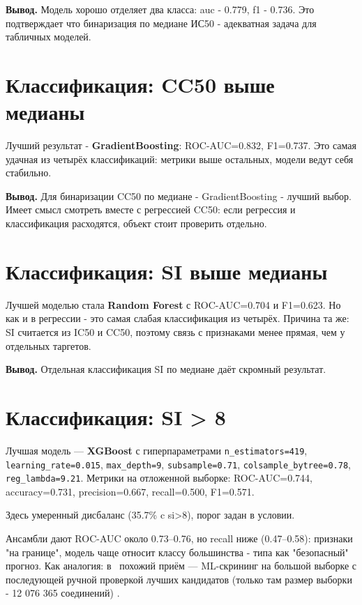 \documentclass[12pt,a4paper]{report}
\begin{document}
\textbf{Вывод.} Модель хорошо отделяет два класса: auc - 0.779, f1 - 0.736. Это подтверждает что бинаризация по медиане ИС50 - адекватная задача для табличных моделей.

\section{Классификация: CC50 выше медианы}

Лучший результат - \textbf{GradientBoosting}: ROC-AUC=0.832, F1=0.737. Это самая удачная из четырёх классификаций: метрики выше остальных, модели ведут себя стабильно.

\textbf{Вывод.} Для бинаризации CC50 по медиане - GradientBoosting - лучший выбор. Имеет смысл смотреть вместе с регрессией CC50: если регрессия и классификация расходятся, объект стоит проверить отдельно.

\section{Классификация: SI выше медианы}

Лучшей моделью стала \textbf{Random Forest} с ROC-AUC=0.704 и F1=0.623. Но как и в регрессии - это самая слабая классификация из четырёх. Причина та же: SI считается из IC50 и CC50, поэтому связь с признаками менее прямая, чем у отдельных таргетов.

\textbf{Вывод.} Отдельная классификация SI по медиане даёт скромный результат. 

\section{Классификация: SI > 8}

Лучшая модель --- \textbf{XGBoost} с гиперпараметрами \texttt{n\_estimators=419}, \texttt{learning\_rate=0.015}, \texttt{max\_depth=9}, \texttt{subsample=0.71}, \texttt{colsample\_bytree=0.78}, \texttt{reg\_lambda=9.21}. Метрики на отложенной выборке: ROC-AUC=0.744, accuracy=0.731, precision=0.667, recall=0.500, F1=0.571.

Здесь умеренный дисбаланс (35.7\% c si>8), порог задан в условии. 

Ансамбли дают ROC-AUC около 0.73--0.76, но recall ниже (0.47--0.58): признаки "на границе", модель чаще относит классу большинства - типа как "безопасный" прогноз. Как аналогия: в~\cite{habr-mit-antibiotics} похожий приём --- ML-скрининг на большой выборке с последующей ручной проверкой лучших кандидатов (только там размер выборки - 12 076 365 соединений) .
\end{document}
